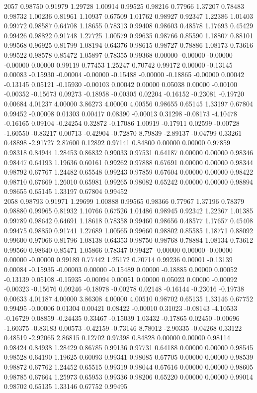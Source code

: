 {2057 0.98750 0.91979 1.29728 1.00914 0.99525 0.98216 0.77966 1.37207 0.78483 0.98732 1.00236 0.81961 1.10937 0.67509 1.01762 0.98927 0.92347 1.22386 1.01403 0.99772 0.98587 0.64708 1.18655 0.78313 0.99408 0.98603 0.48578 1.17693 0.45429 0.99426 0.98822 0.91748 1.27725 1.00579 0.99635 0.98766 0.85590 1.18807 0.88101 0.99568 0.96925 0.81799 1.08194 0.64376 0.98615 0.98727 0.78886 1.08173 0.73616 0.99522 0.98578 0.85472 1.05897 0.78355 0.99368 0.00000 -0.00000 -0.00000 -0.00000 0.00000 0.99119 0.77453 1.25247 0.70742 0.99172 0.00000 -0.13145 0.00083 -0.15930 -0.00004 -0.00000 -0.15488 -0.00000 -0.18865 -0.00000 0.00042 -0.13145 0.05121 -0.15930 -0.00103 0.00042 0.00000 0.05038 0.00000 -0.00100 -0.00352 -0.15673 0.09273 -0.18958 -0.00305 0.02204 -0.16152 -0.23081 -0.19720 0.00684 4.01237 4.00000 3.86273 4.00000 4.00556 0.98655 0.65145 1.33197 0.67804 0.99452 -0.00008 0.01303 0.00417 0.08390 -0.00013 0.31298 -0.08173 -4.10478 -0.16165 0.09104 -0.24254 0.32872 -0.17086 1.00919 -0.17911 0.02599 -0.00728 -1.60550 -0.83217 0.00713 -0.42904 -0.72870 8.79839 -2.89137 -0.04799 0.33261 0.48898 -2.91727 2.87600 0.12892 0.97141 0.84800 0.00000 0.00000 0.97859 0.98318 0.84944 1.28453 0.86832 0.99033 0.97531 0.64187 0.00000 0.00000 0.98346 0.98447 0.64193 1.19636 0.60161 0.99262 0.97888 0.67691 0.00000 0.00000 0.98344 0.98792 0.67767 1.24482 0.65548 0.99243 0.97859 0.67604 0.00000 0.00000 0.98422 0.98710 0.67669 1.26010 0.65981 0.99265 0.98082 0.65242 0.00000 0.00000 0.98894 0.98655 0.65145 1.33197 0.67804 0.99452 \\
2058 0.98793 0.91971 1.29699 1.00888 0.99565 0.98366 0.77967 1.37196 0.78379 0.98880 0.99965 0.81932 1.10766 0.67526 1.01486 0.98945 0.92342 1.22367 1.01385 0.99789 0.98642 0.64691 1.18618 0.78358 0.99460 0.98656 0.48577 1.17657 0.45408 0.99475 0.98850 0.91741 1.27689 1.00565 0.99660 0.98802 0.85585 1.18771 0.88092 0.99600 0.97066 0.81796 1.08138 0.64353 0.98750 0.98768 0.78884 1.08134 0.73612 0.99560 0.98640 0.85471 1.05866 0.78347 0.99427 -0.00000 0.00000 -0.00000 0.00000 -0.00000 0.99189 0.77442 1.25172 0.70714 0.99236 0.00001 -0.13139 0.00084 -0.15935 -0.00003 0.00000 -0.15489 0.00000 -0.18885 0.00000 0.00052 -0.13139 0.05108 -0.15935 -0.00094 0.00051 0.00000 0.05023 0.00000 -0.00092 -0.00323 -0.15676 0.09246 -0.18978 -0.00278 0.02148 -0.16144 -0.23016 -0.19738 0.00633 4.01187 4.00000 3.86308 4.00000 4.00510 0.98702 0.65135 1.33146 0.67752 0.99495 -0.00006 0.01304 0.00421 0.08422 -0.00010 0.31023 -0.08143 -4.10533 -0.16729 0.08859 -0.24435 0.33467 -0.15039 1.03432 -0.17865 0.02450 -0.00696 -1.60375 -0.83183 0.00573 -0.42159 -0.73146 8.78012 -2.90335 -0.04268 0.33122 0.48519 -2.92065 2.86815 0.12702 0.97398 0.84828 0.00000 0.00000 0.98114 0.98424 0.84938 1.28429 0.86785 0.99136 0.97731 0.64188 0.00000 0.00000 0.98545 0.98528 0.64190 1.19625 0.60093 0.99341 0.98085 0.67705 0.00000 0.00000 0.98539 0.98872 0.67762 1.24452 0.65515 0.99319 0.98044 0.67616 0.00000 0.00000 0.98605 0.98785 0.67664 1.25973 0.65953 0.99336 0.98206 0.65220 0.00000 0.00000 0.99014 0.98702 0.65135 1.33146 0.67752 0.99495 \\
}
